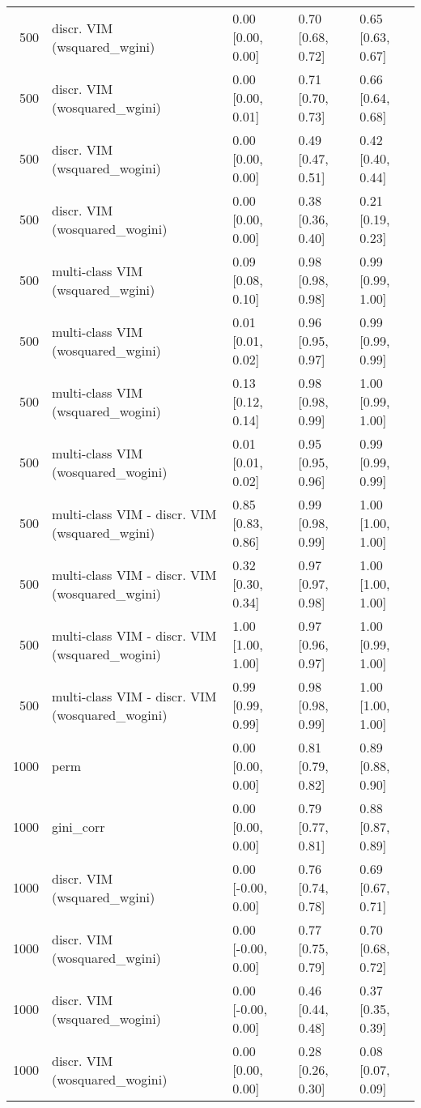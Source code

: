 \begin{table}[ht]
\begin{tabular}{rllll}
  500 & discr. VIM (wsquared\_wgini) & 0.00 [0.00, 0.00] & 0.70 [0.68, 0.72] & 0.65 [0.63, 0.67] \\ 
  500 & discr. VIM (wosquared\_wgini) & 0.00 [0.00, 0.01] & 0.71 [0.70, 0.73] & 0.66 [0.64, 0.68] \\ 
  500 & discr. VIM (wsquared\_wogini) & 0.00 [0.00, 0.00] & 0.49 [0.47, 0.51] & 0.42 [0.40, 0.44] \\ 
  500 & discr. VIM (wosquared\_wogini) & 0.00 [0.00, 0.00] & 0.38 [0.36, 0.40] & 0.21 [0.19, 0.23] \\ 
  500 & multi-class VIM (wsquared\_wgini) & 0.09 [0.08, 0.10] & 0.98 [0.98, 0.98] & 0.99 [0.99, 1.00] \\ 
  500 & multi-class VIM (wosquared\_wgini) & 0.01 [0.01, 0.02] & 0.96 [0.95, 0.97] & 0.99 [0.99, 0.99] \\ 
  500 & multi-class VIM (wsquared\_wogini) & 0.13 [0.12, 0.14] & 0.98 [0.98, 0.99] & 1.00 [0.99, 1.00] \\ 
  500 & multi-class VIM (wosquared\_wogini) & 0.01 [0.01, 0.02] & 0.95 [0.95, 0.96] & 0.99 [0.99, 0.99] \\ 
  500 & multi-class VIM - discr. VIM (wsquared\_wgini) & 0.85 [0.83, 0.86] & 0.99 [0.98, 0.99] & 1.00 [1.00, 1.00] \\ 
  500 & multi-class VIM - discr. VIM (wosquared\_wgini) & 0.32 [0.30, 0.34] & 0.97 [0.97, 0.98] & 1.00 [1.00, 1.00] \\ 
  500 & multi-class VIM - discr. VIM (wsquared\_wogini) & 1.00 [1.00, 1.00] & 0.97 [0.96, 0.97] & 1.00 [0.99, 1.00] \\ 
  500 & multi-class VIM - discr. VIM (wosquared\_wogini) & 0.99 [0.99, 0.99] & 0.98 [0.98, 0.99] & 1.00 [1.00, 1.00] \\ 
   \hline 1000 & perm & 0.00 [0.00, 0.00] & 0.81 [0.79, 0.82] & 0.89 [0.88, 0.90] \\ 
  1000 & gini\_corr & 0.00 [0.00, 0.00] & 0.79 [0.77, 0.81] & 0.88 [0.87, 0.89] \\ 
  1000 & discr. VIM (wsquared\_wgini) & 0.00 [-0.00, 0.00] & 0.76 [0.74, 0.78] & 0.69 [0.67, 0.71] \\ 
  1000 & discr. VIM (wosquared\_wgini) & 0.00 [-0.00, 0.00] & 0.77 [0.75, 0.79] & 0.70 [0.68, 0.72] \\ 
  1000 & discr. VIM (wsquared\_wogini) & 0.00 [-0.00, 0.00] & 0.46 [0.44, 0.48] & 0.37 [0.35, 0.39] \\ 
  1000 & discr. VIM (wosquared\_wogini) & 0.00 [0.00, 0.00] & 0.28 [0.26, 0.30] & 0.08 [0.07, 0.09] \\ 

\end{tabular}
\end{table}
